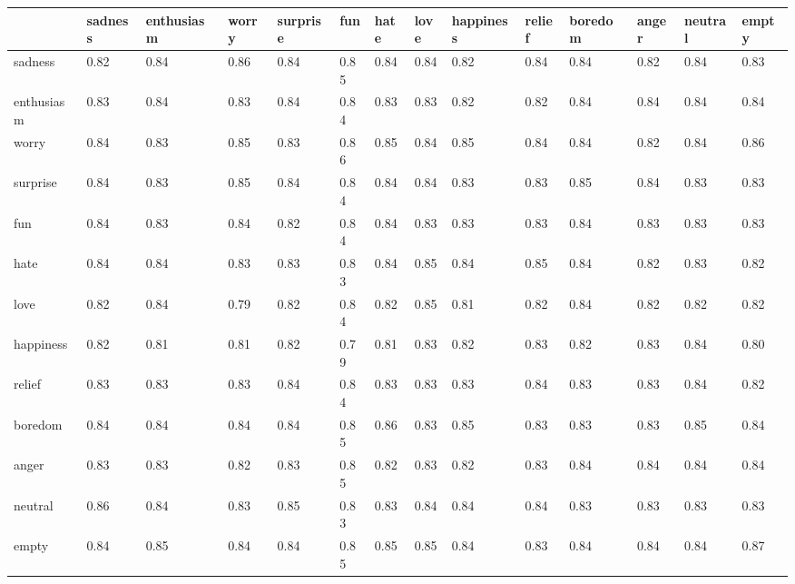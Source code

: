 \begin{tabular}{llllllllllllll}
\toprule
 & sadness & enthusiasm & worry & surprise & fun & hate & love & happiness & relief & boredom & anger & neutral & empty \\
\midrule
sadness & 0.82 & 0.84 & 0.86 & 0.84 & 0.85 & 0.84 & 0.84 & 0.82 & 0.84 & 0.84 & 0.82 & 0.84 & 0.83 \\
enthusiasm & 0.83 & 0.84 & 0.83 & 0.84 & 0.84 & 0.83 & 0.83 & 0.82 & 0.82 & 0.84 & 0.84 & 0.84 & 0.84 \\
worry & 0.84 & 0.83 & 0.85 & 0.83 & 0.86 & 0.85 & 0.84 & 0.85 & 0.84 & 0.84 & 0.82 & 0.84 & 0.86 \\
surprise & 0.84 & 0.83 & 0.85 & 0.84 & 0.84 & 0.84 & 0.84 & 0.83 & 0.83 & 0.85 & 0.84 & 0.83 & 0.83 \\
fun & 0.84 & 0.83 & 0.84 & 0.82 & 0.84 & 0.84 & 0.83 & 0.83 & 0.83 & 0.84 & 0.83 & 0.83 & 0.83 \\
hate & 0.84 & 0.84 & 0.83 & 0.83 & 0.83 & 0.84 & 0.85 & 0.84 & 0.85 & 0.84 & 0.82 & 0.83 & 0.82 \\
love & 0.82 & 0.84 & 0.79 & 0.82 & 0.84 & 0.82 & 0.85 & 0.81 & 0.82 & 0.84 & 0.82 & 0.82 & 0.82 \\
happiness & 0.82 & 0.81 & 0.81 & 0.82 & 0.79 & 0.81 & 0.83 & 0.82 & 0.83 & 0.82 & 0.83 & 0.84 & 0.80 \\
relief & 0.83 & 0.83 & 0.83 & 0.84 & 0.84 & 0.83 & 0.83 & 0.83 & 0.84 & 0.83 & 0.83 & 0.84 & 0.82 \\
boredom & 0.84 & 0.84 & 0.84 & 0.84 & 0.85 & 0.86 & 0.83 & 0.85 & 0.83 & 0.83 & 0.83 & 0.85 & 0.84 \\
anger & 0.83 & 0.83 & 0.82 & 0.83 & 0.85 & 0.82 & 0.83 & 0.82 & 0.83 & 0.84 & 0.84 & 0.84 & 0.84 \\
neutral & 0.86 & 0.84 & 0.83 & 0.85 & 0.83 & 0.83 & 0.84 & 0.84 & 0.84 & 0.83 & 0.83 & 0.83 & 0.83 \\
empty & 0.84 & 0.85 & 0.84 & 0.84 & 0.85 & 0.85 & 0.85 & 0.84 & 0.83 & 0.84 & 0.84 & 0.84 & 0.87 \\
\bottomrule
\end{tabular}
